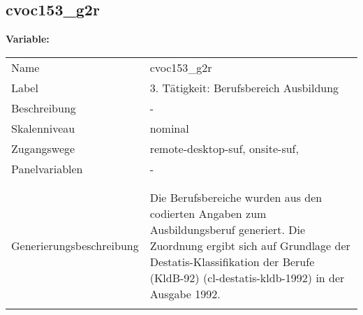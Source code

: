	
	
	\subsection{cvoc153\_g2r}
	\label{subSection:cvoc153_g2r}

	\noindent\textbf{Variable:}\\
		\begin{tabular}{lL{11.3cm}}
			\label{tableVariable:cvoc153_g2r}
			Name & cvoc153\_g2r \\
			Label & 3. Tätigkeit: Berufsbereich Ausbildung \\
			Beschreibung & - \\
			Skalenniveau & nominal \\
			Zugangswege &
				remote-desktop-suf,
				onsite-suf,
 \\
			Panelvariablen & -
			 \\
			 \\
 \\
					Generierungsbeschreibung & Die Berufsbereiche wurden aus den codierten Angaben zum Ausbildungsberuf generiert. Die Zuordnung ergibt sich auf Grundlage der Destatis-Klassifikation der Berufe (KldB-92) (cl-destatis-kldb-1992) in der Ausgabe 1992. 
				 \\	
			 \\
		\end{tabular}






